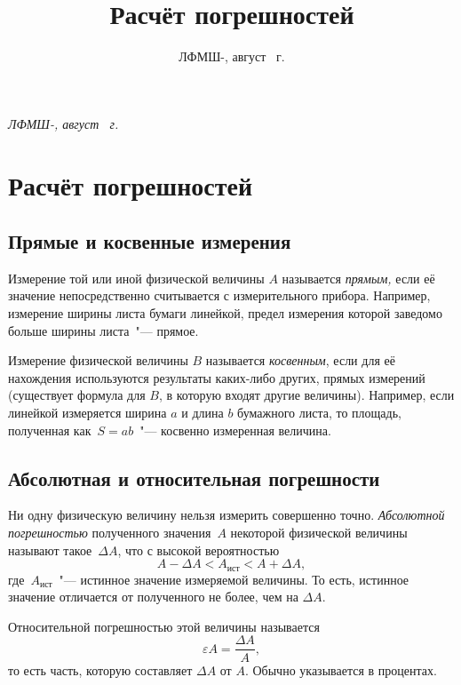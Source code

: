 \documentclass[a4paper,12pt]{article}
\title{Расчёт погрешностей}
\date{ЛФМШ-\arabic{LFMSHnumber}, август {\the \year}~г.}
\newcounter{LFMSHnumber}
\begin{document}
\textit{ЛФМШ-, август {\the \year}~г.}
\section{Расчёт погрешностей}

\subsection{Прямые и косвенные измерения}
Измерение той или иной физической величины $A$ называется \textit{прямым,} если её значение непосредственно считывается с измерительного прибора. Например, измерение ширины листа бумаги линейкой, предел измерения которой заведомо больше ширины листа~"--- прямое.

Измерение физической величины $B$ называется \textit{косвенным}, если для её нахождения используются результаты каких-либо других, прямых измерений (существует формула для $B$, в которую входят другие величины). Например, если линейкой измеряется ширина $a$ и длина $b$ бумажного листа, то площадь, полученная как~$S=ab$~"--- косвенно измеренная величина.

\subsection{Абсолютная и относительная погрешности}
Ни одну физическую величину нельзя измерить совершенно точно. \textit{Абсолютной погрешностью} полученного значения~$A$ некоторой физической величины называют такое~$\Delta A$, что с высокой вероятностью 
\begin{equation}
	A-\Delta A < A_{\text{ист}} < A+\Delta A,
\end{equation}
где~$A_{\text{ист}}$~"--- истинное значение измеряемой величины. То есть, истинное значение отличается от полученного не более, чем на $\Delta A$.

Относительной погрешностью этой величины называется 
\begin{equation}
	\varepsilon A = \frac{\Delta A}{A},
\end{equation}
то есть часть, которую составляет $\Delta A$ от $A$. Обычно указывается в процентах.
\end{document}
